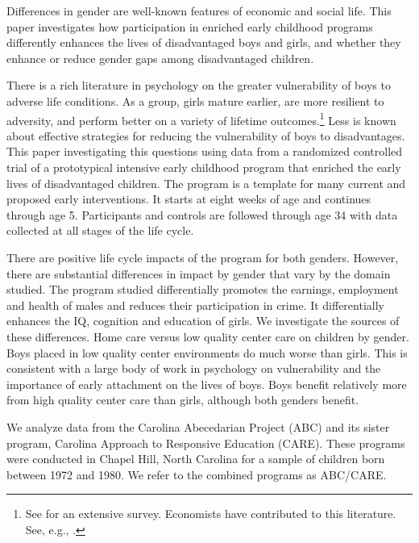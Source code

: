 Differences in gender are well-known features of economic and social life. This paper investigates how participation in enriched early childhood programs differently enhances the lives of disadvantaged boys and girls, and whether they enhance or reduce gender gaps among disadvantaged children.

There is a rich literature in psychology on the greater vulnerability of boys to adverse life conditions. As a group, girls mature earlier, are more resilient to adversity, and perform better on a variety of lifetime outcomes.\footnote{See \cite{Schore_2017_IMHJ} for an extensive survey. Economists have contributed to this literature. See, e.g., \cite{Autor-etal_2015_Family-Disadvantage}.} Less is known about effective strategies for reducing the vulnerability of boys to disadvantages. This paper investigating this questions using data from a randomized controlled trial of a prototypical intensive early childhood program that enriched the early lives of disadvantaged children. The program is a template for many current and proposed early interventions. It starts at eight weeks of age and continues through age 5. Participants and controls are followed through age 34 with data collected at all stages of the life cycle.

There are positive life cycle impacts of the program for both genders. However, there are substantial differences in impact by gender that vary by the domain studied. The program studied differentially promotes the earnings, employment and health of males and reduces their participation in crime. It differentially enhances the IQ, cognition and education of girls. We investigate the sources of these differences. Home care versus low quality center care on children by gender. Boys placed in low quality center environments do much worse than girls. This is consistent with a large body of work in psychology on vulnerability and the importance of early attachment on the lives of boys. Boys benefit relatively more from high quality center care than girls, although both genders benefit.

We analyze data from the Carolina Abecedarian Project (ABC) and its sister program, Carolina Approach to Responsive Education (CARE). These programs were conducted in Chapel Hill, North Carolina for a sample of children born between 1972 and 1980. We refer to the combined programs as ABC/CARE.

